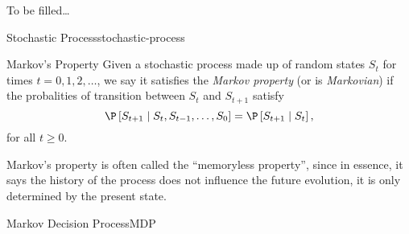 
\label{chapter:Stochastic}

To be filled\ldots



\begin{dfn}{Stochastic Process}{stochastic-process}
\end{dfn}

\begin{dfn}{Markov's Property}
    Given a stochastic process made up of random states $S_t$ for times $t = 0,
    1, 2, \dots$, we say it satisfies the \emph{Markov property} (or is
    \emph{Markovian}) if the probalities of transition between $S_t$ and
    $S_{t+1}$ satisfy
    \begin{equation*}
        \P \left[ S_{t+1} \mid S_t, S_{t-1}, \dots, S_0 \right] = \P \left[ S_{t+1} \mid S_t \right],
    \end{equation*}
    for all $t \geq 0$.
\end{dfn}

Markov's property is often called the ``memoryless property'', since in essence,
it says the history of the process does not influence the future evolution, it
is only determined by the present state.

\begin{dfn}{Markov Decision Process}{MDP}
\end{dfn}